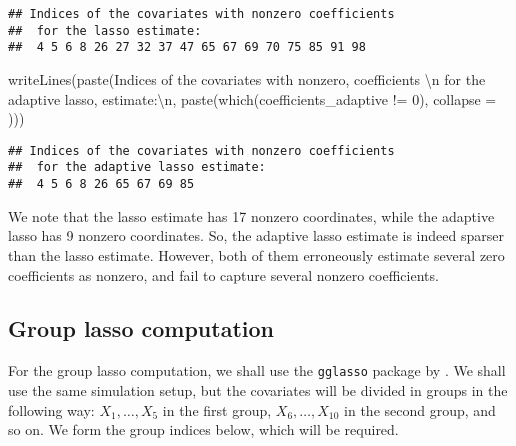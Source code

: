 \documentclass[
]{book}
\newenvironment{Shaded}{\begin{snugshade}}{\end{snugshade}}
\newcommand{\AttributeTok}[1]{\textcolor[rgb]{0.77,0.63,0.00}{#1}}
\newcommand{\DecValTok}[1]{\textcolor[rgb]{0.00,0.00,0.81}{#1}}
\newcommand{\FunctionTok}[1]{\textcolor[rgb]{0.00,0.00,0.00}{#1}}
\newcommand{\NormalTok}[1]{#1}
\newcommand{\SpecialCharTok}[1]{\textcolor[rgb]{0.00,0.00,0.00}{#1}}
\newcommand{\StringTok}[1]{\textcolor[rgb]{0.31,0.60,0.02}{#1}}
\begin{document}
\begin{verbatim}
## Indices of the covariates with nonzero coefficients 
##  for the lasso estimate:
##  4 5 6 8 26 27 32 37 47 65 67 69 70 75 85 91 98
\end{verbatim}

\begin{Shaded}
\begin{Highlighting}[]
\FunctionTok{writeLines}\NormalTok{(}\FunctionTok{paste}\NormalTok{(}\StringTok{\textquotesingle{}Indices of the covariates with nonzero\textquotesingle{}}\NormalTok{,}
                 \StringTok{\textquotesingle{}coefficients }\SpecialCharTok{\textbackslash{}n}\StringTok{ for the adaptive lasso\textquotesingle{}}\NormalTok{,}
                 \StringTok{\textquotesingle{}estimate:}\SpecialCharTok{\textbackslash{}n}\StringTok{\textquotesingle{}}\NormalTok{,}
                 \FunctionTok{paste}\NormalTok{(}\FunctionTok{which}\NormalTok{(coefficients\_adaptive }\SpecialCharTok{!=} \DecValTok{0}\NormalTok{),}
                       \AttributeTok{collapse =} \StringTok{\textquotesingle{} \textquotesingle{}}\NormalTok{)))}
\end{Highlighting}
\end{Shaded}

\begin{verbatim}
## Indices of the covariates with nonzero coefficients 
##  for the adaptive lasso estimate:
##  4 5 6 8 26 65 67 69 85
\end{verbatim}

We note that the lasso estimate has 17 nonzero coordinates, while the adaptive lasso has 9 nonzero coordinates. So, the adaptive lasso estimate is indeed sparser than the lasso estimate. However, both of them erroneously estimate several zero coefficients as nonzero, and fail to capture several nonzero coefficients.

\hypertarget{grouplasso-computation}{%
\subsection{Group lasso computation}\label{grouplasso-computation}}

For the group lasso computation, we shall use the \texttt{gglasso} package by \citet{R-gglasso}. We shall use the same simulation setup, but the covariates will be divided in groups in the following way: \(X_1, \ldots, X_5\) in the first group, \(X_6, \ldots, X_10\) in the second group, and so on. We form the group indices below, which will be required.
\end{document}
